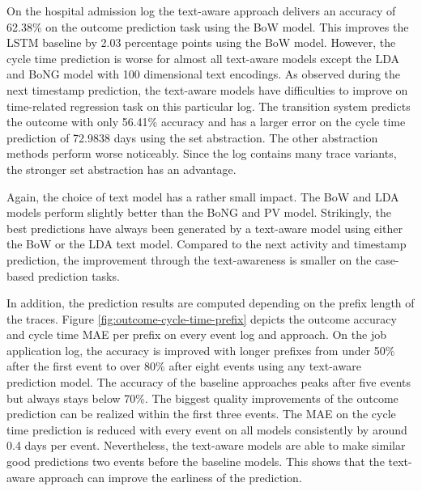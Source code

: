 On the hospital admission log the text-aware approach delivers an accuracy of 62.38\% on the outcome prediction task using the BoW model.
This improves the LSTM baseline by 2.03 percentage points using the BoW model.
However, the cycle time prediction is worse for almost all text-aware models except the LDA and BoNG model with 100 dimensional text encodings.
As observed during the next timestamp prediction, the text-aware models have difficulties to improve on time-related regression task on this particular log.
The transition system predicts the outcome with only 56.41\% accuracy and has a larger error on the cycle time prediction of 72.9838 days using the set abstraction.
The other abstraction methods perform worse noticeably.
Since the log contains many trace variants, the stronger set abstraction has an advantage.

Again, the choice of text model has a rather small impact.
The BoW and LDA models perform slightly better than the BoNG and PV model.
Strikingly, the best predictions have always been generated by a text-aware model using either the BoW or the LDA text model.
Compared to the next activity and timestamp prediction, the improvement through the text-awareness is smaller on the case-based prediction tasks.

In addition, the prediction results are computed depending on the prefix length of the traces.
Figure \ref{fig:outcome-cycle-time-prefix} depicts the outcome accuracy and cycle time MAE per prefix on every event log and approach.
On the job application log, the accuracy is improved with longer prefixes from under 50\% after the first event to over 80\% after eight events using any text-aware prediction model.
The accuracy of the baseline approaches peaks after five events but always stays below 70\%.
The biggest quality improvements of the outcome prediction can be realized within the first three events.
The MAE on the cycle time prediction is reduced with every event on all models consistently by around 0.4 days per event.
Nevertheless, the text-aware models are able to make similar good predictions two events before the baseline models.
This shows that the text-aware approach can improve the earliness of the prediction.

